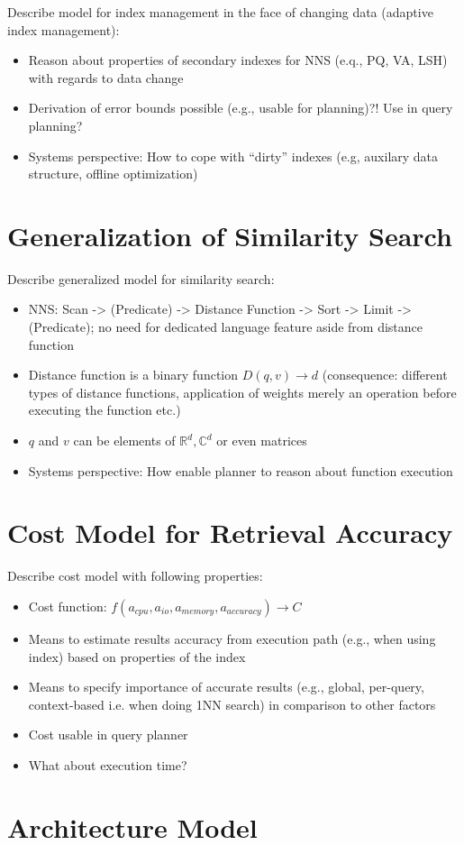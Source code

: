 Describe model for index management in the face of changing data (adaptive index management):

\begin{itemize}
    \item Reason about properties of secondary indexes for NNS (e.q., PQ, VA, LSH) with regards to data change
    \item Derivation of error bounds possible (e.g., usable for planning)?! Use in query planning?
    \item Systems perspective: How to cope with ``dirty'' indexes (e.g, auxilary data structure, offline optimization)
\end{itemize}

\section{Generalization of Similarity Search}

Describe generalized model for similarity search:

\begin{itemize}
    \item NNS: Scan -> (Predicate) -> Distance Function -> Sort -> Limit -> (Predicate); no need for dedicated language feature aside from distance function
    \item Distance function is a binary function $D(q,v) \longrightarrow d$ (consequence: different types of distance functions, application of weights merely an operation before executing the function etc.)
    \item $q$ and $v$ can be elements of $\mathbb{R}^d,\mathbb{C}^d$ or even matrices
    \item Systems perspective: How enable planner to reason about function execution
\end{itemize}

\section{Cost Model for Retrieval Accuracy}
Describe cost model with following properties:

\begin{itemize}
    \item Cost function: $f(a_{cpu}, a_{io}, a_{memory}, a_{accuracy}) \longrightarrow C$
    \item Means to estimate results accuracy from execution path (e.g., when using index) based on properties of the index
    \item Means to specify importance of accurate results (e.g., global, per-query, context-based i.e. when doing 1NN search) in comparison to other factors
    \item Cost usable in query planner
    \item What about execution time?
\end{itemize}

\section{Architecture Model}





